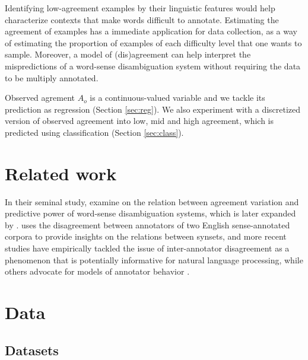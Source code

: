 \documentclass[11pt,a4paper]{article}
\begin{document}
Identifying low-agreement examples by their linguistic features would help characterize contexts that make words difficult to annotate. Estimating the agreement of examples has a immediate application for data collection, as a way of estimating the proportion of examples of each difficulty level that one wants to sample. Moreover, a model of (dis)agreement can help interpret the mispredictions of a word-sense disambiguation system without requiring the data to be multiply annotated. 

Observed agrement $A_o$ is a continuous-valued variable and we tackle its prediction as regression (Section \ref{sec:reg}). We also experiment with a discretized version of observed agreement into low, mid and high agreement, which is predicted using classification (Section \ref{sec:class}).  

\section{Related work}
In their seminal study,  examine on the relation between agreement variation and predictive power of word-sense disambiguation systems, which is later expanded by .
 uses the disagreement between annotators of two English sense-annotated corpora to provide insights on the relations between synsets, and more recent studies \cite{Plank2014,Jurgens2013,Jurgens2014} have empirically tackled the issue of inter-annotator disagreement as a phenomenon that is potentially informative for natural language processing, while others advocate for models of annotator behavior \cite{Passonneau2014,Cohn2013}. 

\section{Data}
\subsection{Datasets}
\end{document}

